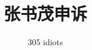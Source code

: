 \documentclass[a4paper]{article}
\begin{document}
\title{张书茂申诉}
\author{305 idiots}
\maketitle
\tableofcontents





\end{document}
